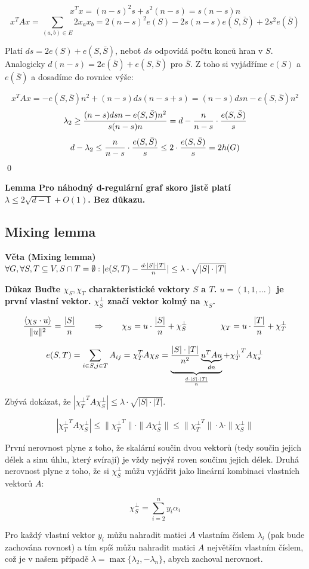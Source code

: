 \documentclass[a4paper,12pt,titlepage]{article}
\newcommand{\lm}{\smallskip\noindent\bf Lemma\rm{} }
\newcommand{\dk}{\smallskip\noindent\bf Důkaz\rm{} }
\newcommand{\vt}{\smallskip\noindent\bf Věta\rm{} }
\newcommand{\xttt}{{\chi_T^\bot}^T}
\newcommand{\sk}[1]{{\langle #1\rangle}}
\begin{document}
$$x^Tx = (n-s)^2s + s^2(n-s) = s(n-s)n$$
$$x^TAx = \sum_{(a,b)\in E} 2x_ax_b = 2(n-s)^2e(S)-2s(n-s)e(S,\bar S) + 2s^2e(\bar S)$$

Platí $ds = 2e(S) + e(S,\bar S)$, neboť $ds$ odpovídá počtu konců hran v $S$. Analogicky $d(n-s) = 2e(\bar S) + e(S,\bar S)$ pro $\bar S$. Z toho si vyjádříme $e(S)$ a $e(\bar S)$ a dosadíme do rovnice výše:

$$x^TAx = -e(S,\bar S)n^2 + (n-s)ds(n-s+s) = (n-s)dsn - e(S,\bar S)n^2$$
$$\lambda_2 \ge {(n-s)dsn - e(S,\bar S)n^2 \over s(n-s)n} = d - {n\over n-s}\cdot{e(S,\bar S)\over s}$$
$$d-\lambda_2 \le {n\over n-s} \cdot {e(S,\bar S)\over s} \le 2\cdot{e(S,\bar S)\over s} = 2h(G)$$
\qed

\lm Pro náhodný d-regulární graf skoro jistě platí $\lambda \le 2\sqrt{d-1} + O(1)$. Bez důkazu.

\subsection{Mixing lemma}
\vt (Mixing lemma) $\forall G, \forall S,T \subseteq V, S\cap T = \emptyset: |e(S,T) - {d\cdot|S|\cdot|T|\over n}| \le \lambda\cdot\sqrt{|S|\cdot|T|}$

\dk Buďte $\chi_S, \chi_T$ charakteristické vektory $S$ a $T$. $u = (1,1,\dots)$ je první vlastní vektor. $\chi_S^\bot$ značí vektor kolmý na $\chi_S$.

$${\sk{\chi_S \cdot u} \over \|u\|^2} = {|S|\over n} \qquad\Rightarrow\qquad \chi_S = u\cdot {|S|\over n} + \chi_S^\bot \qquad\qquad \chi_T = u\cdot {|T|\over n} + \chi_T^\bot$$

$$e(S,T) = \sum_{i\in S, j\in T} A_{ij} = \chi_T^TA\chi_S = \underbrace{{|S|\cdot |T| \over n^2} \underbrace{u^TAu}_{dn}}_{d\cdot |S|\cdot |T|\over n} + \xttt A\chi_s^\bot$$

Zbývá dokázat, že $|\xttt A\chi_S^\bot| \le \lambda\cdot\sqrt{|S|\cdot |T|}$.

$$|\xttt A\chi_S^\bot| \le \|\xttt \| \cdot \|A\chi_S^\bot\| \le \|\xttt\|\cdot\lambda\cdot\|\chi_S^\bot\|$$

První nerovnost plyne z toho, že skalární součin dvou vektorů (tedy součin
jejich délek a sinu úhlu, který svírají) je vždy nejvýš roven součinu jejich
délek. Druhá nerovnost plyne z toho, že si $\chi_S^\bot$ můžu vyjádřit jako
lineární kombinaci vlastních vektorů $A$:

$$\chi_S^\bot = \sum_{i=2}^n y_i\alpha_i$$

Pro každý vlastní vektor $y_i$ můžu nahradit matici $A$ vlastním číslem
$\lambda_i$ (pak bude zachována rovnost) a tím spíš můžu nahradit matici $A$
největším vlastním číslem, což je v našem případě $\lambda =
\max\{\lambda_2,-\lambda_n\}$, abych zachoval nerovnost.
\end{document}
